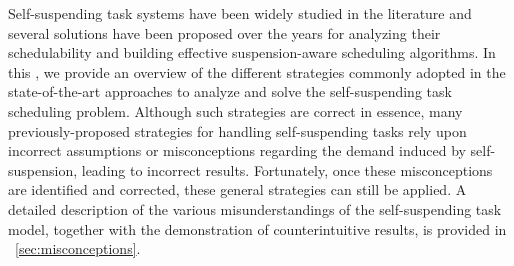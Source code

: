 
\label{sec:review}

Self-suspending task systems have been widely studied in the literature and several solutions have been proposed over the years for 
analyzing their schedulability and building effective suspension-aware scheduling algorithms. In this \mysectionrefnormal{}, we provide an overview of the different 
strategies commonly adopted in the state-of-the-art approaches to
analyze and solve the self-suspending task scheduling problem.
Although such strategies are correct in essence, many
previously-proposed strategies for handling self-suspending tasks
 rely upon incorrect assumptions or misconceptions regarding the
 demand induced by self-suspension, leading to incorrect results.
 Fortunately, once these misconceptions are identified and corrected, these general strategies can still be applied.  
 A detailed 
description of the various misunderstandings of the self-suspending task model, together with the demonstration of 
counterintuitive results, is provided in \mysectionref{}~\ref{sec:misconceptions}.




